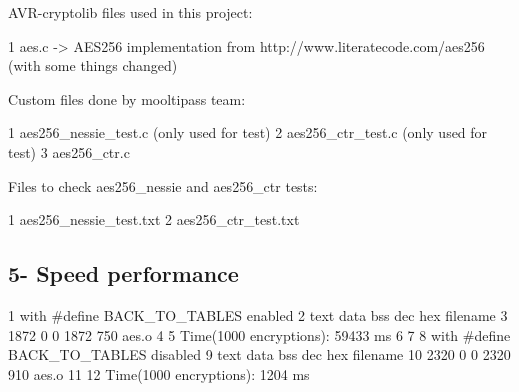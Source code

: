 \begin{DoxyItemize}
\item A\+V\+R-\/cryptolib files used in this project\+:
\end{DoxyItemize}


\begin{DoxyCode}
1 aes.c -> AES256 implementation from http://www.literatecode.com/aes256 (with some things changed)
\end{DoxyCode}



\begin{DoxyItemize}
\item Custom files done by mooltipass team\+:
\end{DoxyItemize}


\begin{DoxyCode}
1 aes256\_nessie\_test.c    (only used for test)
2 aes256\_ctr\_test.c       (only used for test)
3 aes256\_ctr.c
\end{DoxyCode}



\begin{DoxyItemize}
\item Files to check aes256\+\_\+nessie and aes256\+\_\+ctr tests\+:
\end{DoxyItemize}


\begin{DoxyCode}
1 aes256\_nessie\_test.txt
2 aes256\_ctr\_test.txt
\end{DoxyCode}


\subsection*{5-\/ Speed performance }


\begin{DoxyCode}
1 with #define BACK\_TO\_TABLES enabled
2 text     data     bss     dec    hex filename
3 1872       0       0    1872     750 aes.o
4 
5 Time(1000 encryptions): 59433 ms
6 
7 
8 with #define BACK\_TO\_TABLES disabled
9 text    data     bss     dec     hex filename
10 2320       0       0    2320     910 aes.o
11 
12 Time(1000 encryptions): 1204 ms
\end{DoxyCode}
 